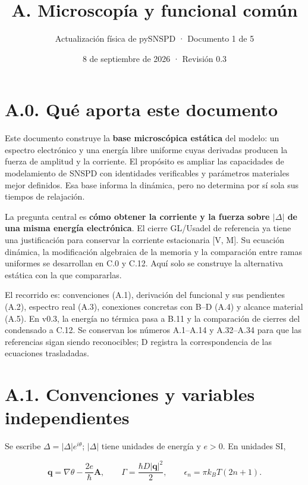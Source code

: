 \documentclass[
  spanish,
  10pt,
  a4paper,
]{article}
\title{A. Microscopía y funcional común}
\subtitle{Actualización física de pySNSPD · Documento 1 de 5}
\author{}
\date{8 de septiembre de 2026 · Revisión 0.3}
\begin{document}
\maketitle

{
\setcounter{tocdepth}{2}
\tableofcontents
}
\newpage

\section{A.0. Qué aporta este
documento}\label{a.0.-quuxe9-aporta-este-documento}

Este documento construye la \textbf{base microscópica estática} del
modelo: un espectro electrónico y una energía libre uniforme cuyas
derivadas producen la fuerza de amplitud y la corriente. El propósito es
ampliar las capacidades de modelamiento de SNSPD con identidades
verificables y parámetros materiales mejor definidos. Esa base informa
la dinámica, pero no determina por sí sola sus tiempos de relajación.

La pregunta central es \textbf{cómo obtener la corriente y la fuerza
sobre \(|\Delta|\) de una misma energía electrónica}. El cierre
GL/Usadel de referencia ya tiene una justificación para conservar la
corriente estacionaria {[}V, M{]}. Su ecuación dinámica, la modificación
algebraica de la memoria y la comparación entre ramas uniformes se
desarrollan en C.0 y C.12. Aquí solo se construye la alternativa
estática con la que compararlas.

El recorrido es: convenciones (A.1), derivación del funcional y sus
pendientes (A.2), espectro real (A.3), conexiones concretas con B--D
(A.4) y alcance material (A.5). En v0.3, la energía no térmica pasa a
B.11 y la comparación de cierres del condensado a C.12. Se conservan los
números A.1--A.14 y A.32--A.34 para que las referencias sigan siendo
reconocibles; D registra la correspondencia de las ecuaciones
trasladadas.

\section{A.1. Convenciones y variables
independientes}\label{a.1.-convenciones-y-variables-independientes}

Se escribe \(\Delta=|\Delta|e^{i\theta}\); \(|\Delta|\) tiene unidades
de energía y \(e>0\). En unidades SI,

\[
\mathbf q=\nabla\theta-\frac{2e}{\hbar}\mathbf A,
\qquad \Gamma=\frac{\hbar D|\mathbf q|^2}{2},
\qquad \epsilon_n=\pi k_BT(2n+1).
\tag{A.1}
\]
\end{document}
